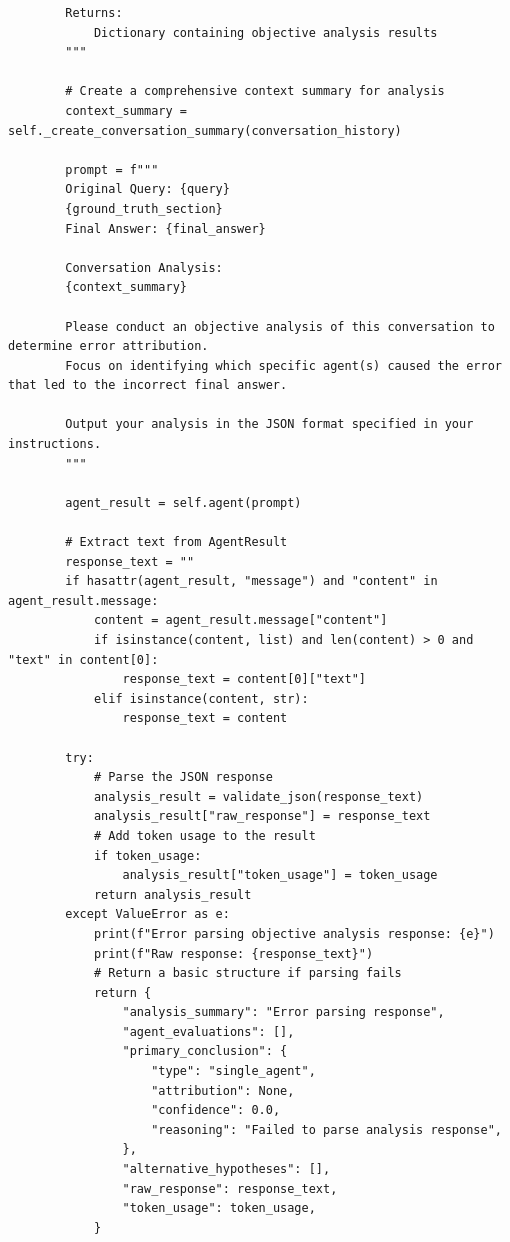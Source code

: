 \documentclass{article}
\begin{document}
\begin{lstlisting}
        Returns:
            Dictionary containing objective analysis results
        """

        # Create a comprehensive context summary for analysis
        context_summary = self._create_conversation_summary(conversation_history)

        prompt = f"""
        Original Query: {query}
        {ground_truth_section}
        Final Answer: {final_answer}
        
        Conversation Analysis:
        {context_summary}
        
        Please conduct an objective analysis of this conversation to determine error attribution.
        Focus on identifying which specific agent(s) caused the error that led to the incorrect final answer.

        Output your analysis in the JSON format specified in your instructions.
        """

        agent_result = self.agent(prompt)

        # Extract text from AgentResult
        response_text = ""
        if hasattr(agent_result, "message") and "content" in agent_result.message:
            content = agent_result.message["content"]
            if isinstance(content, list) and len(content) > 0 and "text" in content[0]:
                response_text = content[0]["text"]
            elif isinstance(content, str):
                response_text = content

        try:
            # Parse the JSON response
            analysis_result = validate_json(response_text)
            analysis_result["raw_response"] = response_text
            # Add token usage to the result
            if token_usage:
                analysis_result["token_usage"] = token_usage
            return analysis_result
        except ValueError as e:
            print(f"Error parsing objective analysis response: {e}")
            print(f"Raw response: {response_text}")
            # Return a basic structure if parsing fails
            return {
                "analysis_summary": "Error parsing response",
                "agent_evaluations": [],
                "primary_conclusion": {
                    "type": "single_agent",
                    "attribution": None,
                    "confidence": 0.0,
                    "reasoning": "Failed to parse analysis response",
                },
                "alternative_hypotheses": [],
                "raw_response": response_text,
                "token_usage": token_usage,
            }


\end{lstlisting}
\end{document}
